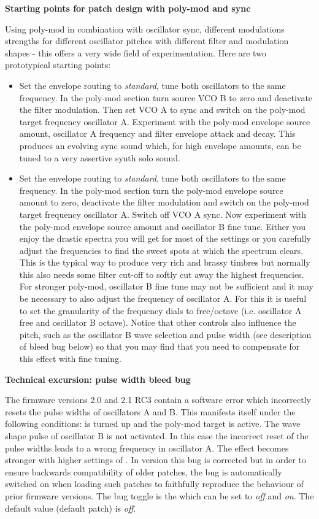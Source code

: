 \textbf{Starting points for patch design with poly-mod and sync}

Using poly-mod in combination with oscillator sync, different modulations strengths for different oscillator pitches with different filter and modulation shapes - this offers a very wide field of experimentation. Here are two prototypical starting points:

\begin{itemize}
  \item Set the envelope routing to \textit{standard}, tune both oscillators to the same frequency. In the poly-mod section turn source VCO B to zero and deactivate the filter modulation. Then set VCO A to sync and switch on the poly-mod target frequency oscillator A. Experiment with the poly-mod envelope source amount, oscillator A frequency and filter envelope attack and decay. This produces an evolving sync sound which, for high envelope amounts, can be tuned to a very assertive synth solo sound.
  \item Set the envelope routing to \textit{standard}, tune both oscillators to the same frequency. In the poly-mod section turn the poly-mod envelope source amount to zero, deactivate the filter modulation  and switch on the poly-mod target frequency oscillator A. Switch off VCO A sync. Now experiment with the poly-mod envelope source amount and oscillator B fine tune. Either you enjoy the drastic spectra you will get for most of the settings or you carefully adjust the frequencies to find the sweet spots at which the spectrum clears. This is the typical way to produce very rich and brassy timbres but normally this also needs some filter cut-off to softly cut away the highest frequencies. For stronger poly-mod, oscillator B fine tune may not be sufficient and it may be necessary to also adjust the frequency of oscillator A. For this it is useful to set the granularity of the frequency dials to free/octave (i.e. oscillator A free and oscillator B octave). Notice that other controls also influence the pitch, such as the oscillator B wave selection and pulse width (see description of bleed bug below) so that you may find that you need to compensate for this effect with fine tuning.   
\end{itemize} 

\textbf{Technical excursion: pulse width bleed bug}

The firmware versions 2.0 and 2.1 RC3 contain a software error which incorrectly resets the pulse widths of oscillators A and B. This manifests itself under the following conditions: \polymodosc is turned up and the poly-mod target \polymodfreq is active. The wave shape pulse of oscillator B is not activated. In this case the incorrect reset of the pulse widths leads to a wrong frequency in oscillator A. The effect becomes stronger with higher settings of \polymodosc. In version \version this bug is corrected but in order to ensure backwards compatibility of older patches, the bug is automatically switched on when loading such patches to faithfully reproduce the behaviour of prior firmware versions.  The bug toggle is the \syncbug which can be set to \textit{off} and \textit{on}. The default value (default patch) is \textit{off}.
